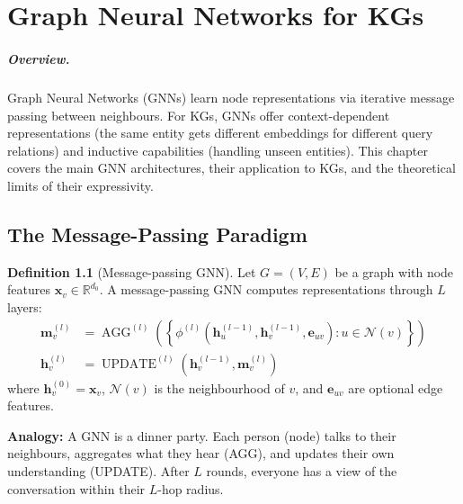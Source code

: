 \documentclass[11pt,a4paper,oneside,openany]{book}
\theoremstyle{definition}
\newtheorem{definition}{Definition}[chapter]
\theoremstyle{plain}
\theoremstyle{remark}
\newcommand{\R}{\mathbb{R}}
\begin{document}
\chapter{Graph Neural Networks for KGs}\label{ch:gnns}

\paragraph{Overview.}
Graph Neural Networks (GNNs) learn node representations via iterative message passing between neighbours. For KGs, GNNs offer context-dependent representations (the same entity gets different embeddings for different query relations) and inductive capabilities (handling unseen entities). This chapter covers the main GNN architectures, their application to KGs, and the theoretical limits of their expressivity.

\section{The Message-Passing Paradigm}\label{sec:mpnn}

\begin{definition}[Message-passing GNN]
	Let $G = (V, E)$ be a graph with node features $\mathbf{x}_v \in \R^{d_0}$. A message-passing GNN computes representations through $L$ layers:
	\begin{align*}
		\mathbf{m}_v^{(l)} & = \operatorname{AGG}^{(l)}\!\left( \left\{ \phi^{(l)}(\mathbf{h}_u^{(l-1)}, \mathbf{h}_v^{(l-1)}, \mathbf{e}_{uv}) : u \in \mathcal{N}(v) \right\} \right) \\
		\mathbf{h}_v^{(l)} & = \operatorname{UPDATE}^{(l)}(\mathbf{h}_v^{(l-1)}, \mathbf{m}_v^{(l)})
	\end{align*}
	where $\mathbf{h}_v^{(0)} = \mathbf{x}_v$, $\mathcal{N}(v)$ is the neighbourhood of $v$, and $\mathbf{e}_{uv}$ are optional edge features.
\end{definition}

\noindent\textbf{Analogy:} A GNN is a dinner party. Each person (node) talks to their neighbours, aggregates what they hear (AGG), and updates their own understanding (UPDATE). After $L$ rounds, everyone has a view of the conversation within their $L$-hop radius.
\end{document}
